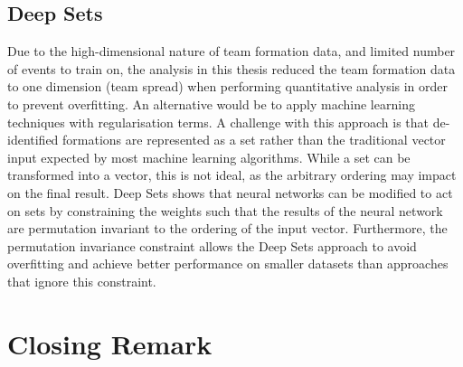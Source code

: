 



\subsection{Deep Sets}

Due to the high-dimensional nature of team formation data, and limited number of events to train on, the analysis in this thesis reduced the team formation data to one dimension (team spread) when performing quantitative analysis in order to prevent overfitting. An alternative would be to apply machine learning techniques with regularisation terms. A challenge with this approach is that de-identified formations are represented as a set rather than the traditional vector input expected by most machine learning algorithms. While a set can be transformed into a vector, this is not ideal, as the arbitrary ordering may impact on the final result. Deep Sets \cite{Zaheer2017} shows that neural networks can be modified to act on sets by constraining the weights such that the results of the neural network are permutation invariant to the ordering of the input vector. Furthermore, the permutation invariance constraint allows the Deep Sets approach to avoid overfitting and achieve better performance on smaller datasets than approaches that ignore this constraint.

\section{Closing Remark}

